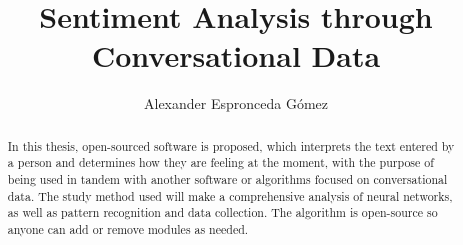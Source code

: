 \documentclass[a4]{sciposter}
\title{Sentiment Analysis through Conversational Data}
\author{Alexander Espronceda Gómez}
\institute {Facultad de Ingeniería Mecánica y Eléctrica}
\begin{document}

\maketitle
\begin{abstract}
In this thesis, open-sourced software is proposed, which interprets the text entered by a person and determines how they are feeling at the moment, with the purpose of being used in tandem with another software or algorithms focused on conversational data.
The study method used will make a comprehensive analysis of neural networks, as well as pattern recognition and data collection.
The algorithm is open-source so anyone can add or remove modules as needed.
\end{abstract}
\end{document}
